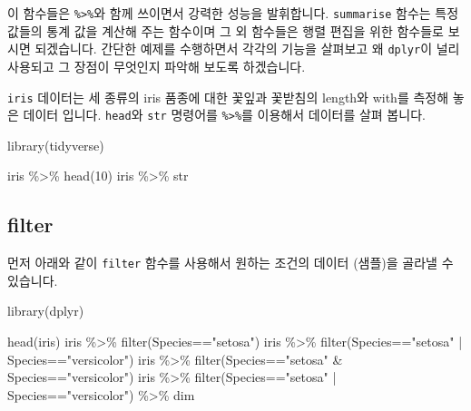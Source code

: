 \documentclass[
]{book}
\newenvironment{Shaded}{\begin{snugshade}}{\end{snugshade}}
\newcommand{\DecValTok}[1]{\textcolor[rgb]{0.00,0.00,0.81}{#1}}
\newcommand{\FunctionTok}[1]{\textcolor[rgb]{0.00,0.00,0.00}{#1}}
\newcommand{\NormalTok}[1]{#1}
\newcommand{\SpecialCharTok}[1]{\textcolor[rgb]{0.00,0.00,0.00}{#1}}
\newcommand{\StringTok}[1]{\textcolor[rgb]{0.31,0.60,0.02}{#1}}
\begin{document}
이 함수들은 \texttt{\%\textgreater{}\%}와 함께 쓰이면서 강력한 성능을 발휘합니다. \texttt{summarise} 함수는 특정 값들의 통계 값을 계산해 주는 함수이며 그 외 함수들은 행렬 편집을 위한 함수들로 보시면 되겠습니다. 간단한 예제를 수행하면서 각각의 기능을 살펴보고 왜 \texttt{dplyr}이 널리 사용되고 그 장점이 무엇인지 파악해 보도록 하겠습니다.

\texttt{iris} 데이터는 세 종류의 iris 품종에 대한 꽃잎과 꽃받침의 length와 with를 측정해 놓은 데이터 입니다. \texttt{head}와 \texttt{str} 명령어를 \texttt{\%\textgreater{}\%}를 이용해서 데이터를 살펴 봅니다.

\begin{Shaded}
\begin{Highlighting}[]
\FunctionTok{library}\NormalTok{(tidyverse)}

\NormalTok{iris }\SpecialCharTok{\%\textgreater{}\%} \FunctionTok{head}\NormalTok{(}\DecValTok{10}\NormalTok{)}
\NormalTok{iris }\SpecialCharTok{\%\textgreater{}\%}\NormalTok{ str}
\end{Highlighting}
\end{Shaded}

\hypertarget{filter}{%
\subsection{filter}\label{filter}}

먼저 아래와 같이 \texttt{filter} 함수를 사용해서 원하는 조건의 데이터 (샘플)을 골라낼 수 있습니다.

\begin{Shaded}
\begin{Highlighting}[]
\FunctionTok{library}\NormalTok{(dplyr)}

\FunctionTok{head}\NormalTok{(iris)}
\NormalTok{iris }\SpecialCharTok{\%\textgreater{}\%} \FunctionTok{filter}\NormalTok{(Species}\SpecialCharTok{==}\StringTok{"setosa"}\NormalTok{)}
\NormalTok{iris }\SpecialCharTok{\%\textgreater{}\%} \FunctionTok{filter}\NormalTok{(Species}\SpecialCharTok{==}\StringTok{"setosa"} \SpecialCharTok{|}\NormalTok{ Species}\SpecialCharTok{==}\StringTok{"versicolor"}\NormalTok{)}
\NormalTok{iris }\SpecialCharTok{\%\textgreater{}\%} \FunctionTok{filter}\NormalTok{(Species}\SpecialCharTok{==}\StringTok{"setosa"} \SpecialCharTok{\&}\NormalTok{ Species}\SpecialCharTok{==}\StringTok{"versicolor"}\NormalTok{)}
\NormalTok{iris }\SpecialCharTok{\%\textgreater{}\%} 
  \FunctionTok{filter}\NormalTok{(Species}\SpecialCharTok{==}\StringTok{"setosa"} \SpecialCharTok{|}\NormalTok{ Species}\SpecialCharTok{==}\StringTok{"versicolor"}\NormalTok{) }\SpecialCharTok{\%\textgreater{}\%} 
\NormalTok{  dim}
\end{Highlighting}
\end{Shaded}
\end{document}
